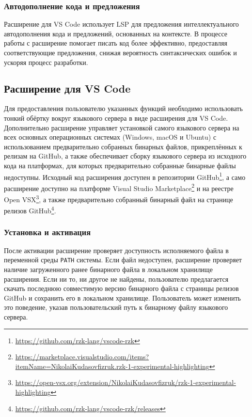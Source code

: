 \subsubsection{Автодополнение кода и предложения}

Расширение для VS Code \Rzk{} использует LSP для предложения интеллектуального
автодополнения кода и предложений, основанных на контексте. В процессе работы
с \Rzk{} расширение помогает писать код более эффективно, предоставляя
соответствующие предложения, снижая вероятность синтаксических ошибок и
ускоряя процесс разработки.

\subsection{Расширение для VS Code}

Для предоставления пользователю указанных функций необходимо использовать тонкий обёртку вокруг языкового сервера в виде расширения для VS Code. Дополнительно расширение управляет установкой самого языкового сервера на всех основных операционных системах (Windows, macOS и Ubuntu) с использованием предварительно собранных бинарных файлов, прикреплённых к релизам на GitHub, а также обеспечивает сборку языкового сервера из исходного кода на платформах, для которых предварительно собранные бинарные файлы недоступны. Исходный код расширения доступен в репозитории GitHub\footnote{\url{https://github.com/rzk-lang/vscode-rzk}}, а само расширение доступно на платформе Visual Studio Marketplace\footnote{\url{https://marketplace.visualstudio.com/items?itemName=NikolaiKudasovfizruk.rzk-1-experimental-highlighting}} и на реестре Open VSX\footnote{\url{https://open-vsx.org/extension/NikolaiKudasovfizruk/rzk-1-experimental-highlighting}}, а также предварительно собранный бинарный файл на странице релизов GitHub\footnote{\url{https://github.com/rzk-lang/vscode-rzk/releases}}.

\subsubsection{Установка и активация}

После активации расширение проверяет доступность исполняемого файла \Rzk{} в переменной среды \texttt{PATH} системы. Если файл недоступен, расширение проверяет наличие загруженного ранее бинарного файла в локальном хранилище расширения. Если ни то, ни другое не найдены, пользователю предлагается скачать последнюю совместимую версию бинарного файла с страницы релизов GitHub и сохранить его в локальном хранилище. Пользователь может изменить это поведение, указав пользовательский путь к бинарному файлу языкового сервера.

